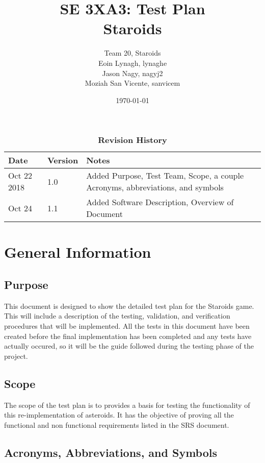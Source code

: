 \documentclass[12pt, titlepage]{article}
\title{SE 3XA3: Test Plan\\Staroids}
\author{Team 20, Staroids
		\\ Eoin Lynagh, lynaghe
		\\ Jason Nagy, nagyj2
		\\ Moziah San Vicente, sanvicem
}
\date{\today}
\begin{document}
\maketitle

\tableofcontents
\listoftables
\listoffigures

\begin{table}[bp]
\caption{\bf Revision History}
\begin{tabularx}{\textwidth}{p{3cm}p{2cm}X}
\toprule {\bf Date} & {\bf Version} & {\bf Notes}\\
\midrule
Oct 22 2018 & 1.0 & Added Purpose, Test Team, Scope, a couple Acronyms, abbreviations, and symbols\\
Oct 24 & 1.1 & Added Software Description, Overview of Document\\
\bottomrule
\end{tabularx}
\end{table}

\newpage


\section{General Information}

\subsection{Purpose}
This document is designed to show the detailed test plan for the Staroids game. This will include a description of the testing, validation, and verification procedures that will be implemented. All the tests in this document have been created before the final implementation has been completed and any tests have actually occured, so it will be the guide followed during the testing phase of the project.

\subsection{Scope}
The scope of the test plan is to provides a basis for testing the functionality of this re-implementation of asteroids. It has the objective of proving all the functional and non functional requirements listed in the SRS document.

\subsection{Acronyms, Abbreviations, and Symbols}
\end{document}
